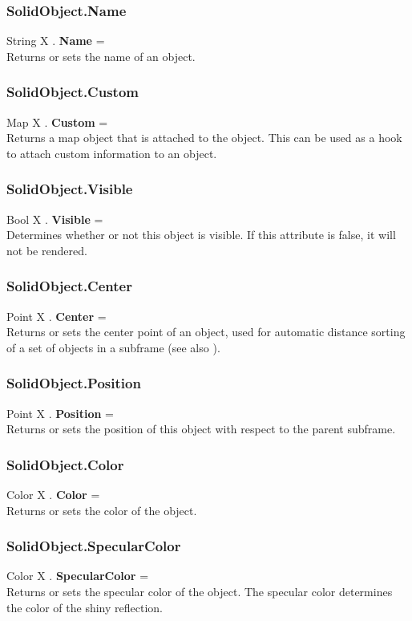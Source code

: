 \subsubsection{SolidObject.Name \label{F:SolidObject:Name}}
String X . \textbf{Name} = \\
Returns or sets the name of an object.

\subsubsection{SolidObject.Custom \label{F:SolidObject:Custom}}
Map X . \textbf{Custom} = \\
Returns a map object that is attached to the object. This can be used as a hook to attach custom information to an object.


\subsubsection{SolidObject.Visible \label{F:SolidObject:Visible}}
Bool X . \textbf{Visible} = \\
Determines whether or not this object is visible. If this attribute is false, it will not be rendered.

\subsubsection{SolidObject.Center \label{F:SolidObject:Center}}
Point X . \textbf{Center} = \\
Returns or sets the center point of an object, used for automatic distance sorting of a set of objects in a subframe (see also ).

\subsubsection{SolidObject.Position \label{F:SolidObject:Position}}
Point X . \textbf{Position} = \\
Returns or sets the position of this object with respect to the parent subframe.

\subsubsection{SolidObject.Color \label{F:SolidObject:Color}}
Color X . \textbf{Color} = \\
Returns or sets the color of the object.

\subsubsection{SolidObject.SpecularColor \label{F:SolidObject:SpecularColor}}
Color X . \textbf{SpecularColor} = \\
Returns or sets the specular color of the object. The specular color determines the color of the shiny reflection.

